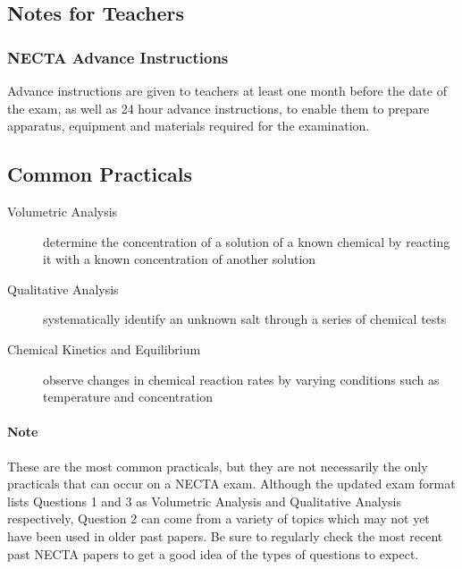 \subsection{Notes for Teachers}

\subsubsection{NECTA Advance Instructions}
Advance instructions are given to teachers at least one month before the date of the exam, as well as 24 hour advance instructions, to enable them to prepare apparatus, equipment and materials required for the examination.




\subsection{Common Practicals}
\begin{description}
\item[Volumetric Analysis]{determine the concentration of a solution of a known chemical by reacting it with a known concentration of another solution}
\item[Qualitative Analysis]{systematically identify an unknown salt through a series of chemical tests}
\item[Chemical Kinetics and Equilibrium]{observe changes in chemical reaction rates by varying conditions such as temperature and concentration}
\end{description}

\paragraph{Note} These are the most common practicals, but they are not necessarily the only practicals that can occur on a NECTA exam. Although the updated exam format lists Questions 1 and 3 as Volumetric Analysis and Qualitative Analysis respectively, Question 2 can come from a variety of topics which may not yet have been used in older past papers. Be sure to regularly check the most recent past NECTA papers to get a good idea of the types of questions to expect. 

